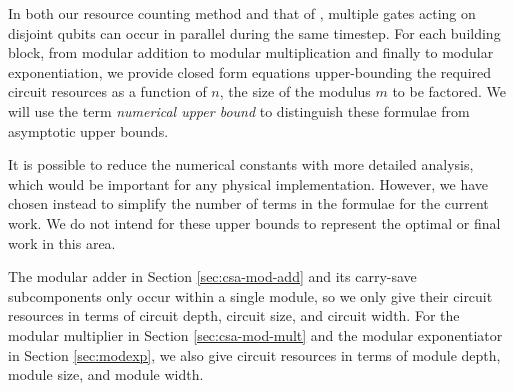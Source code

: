 In both our resource counting method and that of \cite{Fowler2004,Kutin2006}, multiple gates acting on disjoint qubits
can occur in parallel during the same timestep. For each building block,
from modular addition to modular multiplication and finally to modular
exponentiation, we provide closed form equations upper-bounding the required circuit
resources as a function of $n$, the size of the modulus $m$ to be factored.
We will use the
term \emph{numerical upper bound} to distinguish these formulae from asymptotic
upper bounds.

It is possible to reduce the numerical constants with more detailed analysis,
which would be important for any physical implementation.
However, we have chosen instead to simplify the number of terms in the formulae
for the current work. We do not intend for these upper bounds to represent
the optimal or final work in this area.

The modular adder in Section \ref{sec:csa-mod-add} and its carry-save
subcomponents only occur within a single module, so we only give their
circuit resources in terms of circuit depth, circuit size, and circuit width. 
For the modular multiplier in
Section \ref{sec:csa-mod-mult} and the modular exponentiator in
Section \ref{sec:modexp}, we also give circuit resources in
terms of module depth, module size, and module width.
